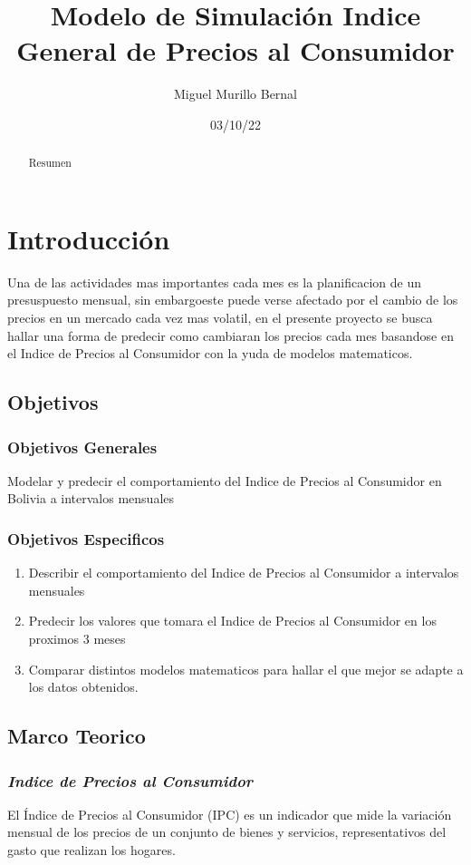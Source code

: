 \documentclass[a4paper,10pt]{article}
\title{Modelo de Simulación Indice General de Precios al Consumidor}
\author{Miguel Murillo Bernal}
\affil{mmurillob@fcpn.edu.bo}
\date{03/10/22}
\begin{document}
\newcommand{\ipc}{\emph{Indice de Precios al Consumidor}}
\maketitle
\begin{abstract}
Resumen
\end{abstract}
\section{Introducción}

Una de las actividades mas importantes cada mes es la planificacion de un
presuspuesto mensual, sin embargoeste puede verse afectado por el cambio de
los precios en un mercado cada vez mas volatil, en el presente proyecto se busca
hallar una forma de predecir como cambiaran los precios cada mes basandose
en el Indice de Precios al Consumidor con la yuda de modelos matematicos.
\subsection{Objetivos}
\subsubsection{ Objetivos Generales}
Modelar y predecir el comportamiento del Indice de Precios al Consumidor en Bolivia a intervalos mensuales
\subsubsection{Objetivos Especificos}

\begin{enumerate}
 \item Describir el comportamiento del Indice de Precios al Consumidor a intervalos mensuales
 \item Predecir los valores que tomara el Indice de Precios al Consumidor en los proximos 3 meses
 \item Comparar distintos modelos matematicos para hallar el que mejor se adapte a los datos obtenidos.
\end{enumerate}

\subsection{Marco Teorico}
\subsubsection{\ipc}
El Índice de Precios al Consumidor (IPC) es un indicador que mide la variación mensual de los precios de un conjunto de bienes y servicios, representativos del gasto que realizan los hogares.
\end{document}
